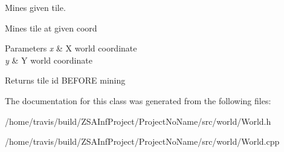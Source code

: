 Mines given tile. 

Mines tile at given coord 
\begin{DoxyParams}{Parameters}
{\em x} & X world coordinate \\
\hline
{\em y} & Y world coordinate \\
\hline
\end{DoxyParams}
\begin{DoxyReturn}{Returns}
tile id B\-E\-F\-O\-R\-E mining 
\end{DoxyReturn}


The documentation for this class was generated from the following files\-:\begin{DoxyCompactItemize}
\item 
/home/travis/build/\-Z\-S\-A\-Inf\-Project/\-Project\-No\-Name/src/world/World.\-h\item 
/home/travis/build/\-Z\-S\-A\-Inf\-Project/\-Project\-No\-Name/src/world/World.\-cpp\end{DoxyCompactItemize}
